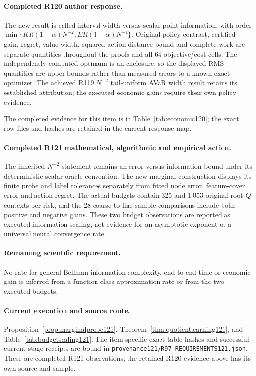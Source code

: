 \paragraph{Completed R120 author response.}
The new result is called interval width versus scalar point information, with order $\min\{KR(1-\alpha)N^{-2},ER(1-\alpha)N^{-1}\}$. Original-policy contrast, certified gain, regret, value width, squared action-distance bound and complete work are separate quantities throughout the proofs and all 64 objective/cost cells. The independently computed optimum is an enclosure, so the displayed RMS quantities are upper bounds rather than measured errors to a known exact optimizer. The achieved R119 $N^{-2}$ tail-uniform AVaR width result retains its established attribution; the executed economic gains require their own policy evidence.

The completed evidence for this item is in Table~\ref{tab:economic120}; the exact row files and hashes are retained in the current response map.

\paragraph{Completed R121 mathematical, algorithmic and empirical action.}
The inherited $N^{-2}$ statement remains an error-versus-information bound under its deterministic scalar oracle convention. The new marginal construction displays its finite probe and label tolerances separately from fitted node error, feature-cover error and action regret. The actual budgets contain 325 and 1,053 original root-$Q$ contexts per risk, and the 28 coarse-to-fine sample comparisons include both positive and negative gains. These two budget observations are reported as executed information scaling, not evidence for an asymptotic exponent or a universal neural convergence rate.

\paragraph{Remaining scientific requirement.}
No rate for general Bellman information complexity, end-to-end time or economic gain is inferred from a function-class approximation rate or from the two executed budgets.

\paragraph{Current execution and source route.}
Proposition~\ref{prop:marginalprobe121}, Theorem~\ref{thm:quotientlearning121}, and Table~\ref{tab:budgetscaling121}.
The item-specific exact table hashes and successful current-stage receipts are bound in \nolinkurl{provenance121/R97_REQUIREMENTS121.json}. These are completed R121 observations; the retained R120 evidence above has its own source and sample.

